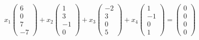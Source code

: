 \begin{align*}
    x_1 \begin{pmatrix}
            6 \\ 0 \\ 7 \\ -7
        \end{pmatrix} + x_2 \begin{pmatrix}
                                1 \\3 \\ -1 \\ 0
                            \end{pmatrix} + x_3 \begin{pmatrix}
                                                    -2 \\ 3 \\ 0 \\ 5
                                                \end{pmatrix} + x_4 \begin{pmatrix}
                                                                        1 \\ -1 \\ 0 \\ 1
                                                                    \end{pmatrix} = \begin{pmatrix}
                                                                                        0 \\ 0 \\ 0 \\ 0
                                                                                    \end{pmatrix}
\end{align*}


